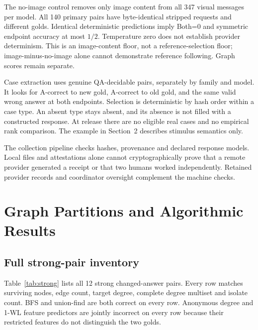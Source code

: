 \documentclass[10pt,twocolumn,letterpaper]{article}
\begin{document}
The no-image control removes only image content from all 347 visual
messages per model. All 140 primary pairs have byte-identical stripped
requests and different golds. Identical deterministic predictions imply
Both=0 and symmetric endpoint accuracy at most $1/2$. Temperature zero
does not establish provider determinism. This is an image-content floor,
not a reference-selection floor; image-minus-no-image alone cannot
demonstrate reference following. Graph scores remain separate.

Case extraction uses genuine QA-decidable pairs, separately by family
and model. It looks for A-correct to new gold, A-correct to old gold,
and the same valid wrong answer at both endpoints. Selection is
deterministic by hash order within a case type. An absent type stays
absent, and its absence is not filled with a constructed response.
At release there are no eligible real cases and no empirical rank
comparison. The example in Section~2 describes stimulus semantics only.

The collection pipeline checks hashes, provenance and declared
response models. Local files and attestations alone cannot
cryptographically prove that a remote provider generated a receipt
or that two humans worked independently. Retained provider records
and coordinator oversight complement the machine checks.

\section{Graph Partitions and Algorithmic Results}
\subsection{Full strong-pair inventory}
Table~\ref{tab:strong} lists all 12 strong changed-answer pairs.
Every row matches surviving nodes, edge count, target degree,
complete degree multiset and isolate count. BFS and union-find are
both correct on every row. Anonymous degree and 1-WL feature
predictors are jointly incorrect on every row because their restricted
features do not distinguish the two golds.

\begin{table}[H]
\centering\small
\caption{Every strong change pair; 12 pairs from eight sources.
The final column is the exact per-pair result, not an average
over generated variants. BFS and union-find have Both=1 on every row.
The machine audit additionally supplies full feature signatures,
source-held-out lookup support and predictions.}
\label{tab:strong}

\end{table}
\end{document}
